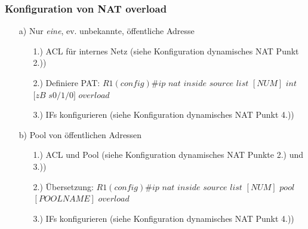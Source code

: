 \documentclass[landscape,twocolumn,a4paper]{article}
\begin{document}
\begin{footnotesize}
\subsubsection{Konfiguration von NAT overload}
\begin{itemize}
	\item[a)] Nur \textit{eine}, ev. unbekannte, öffentliche Adresse
	\begin{itemize}
		\item[1.)] ACL für internes Netz (siehe Konfiguration dynamisches NAT Punkt 2.))
		\item[2.)] Definiere PAT: $R1(config)\#ip$ $nat$ $inside$ $source$ $list$ $[NUM]$ $int$ $[zB$ $s0/1/0]$ $overload$
		\item[3.)] IFs konfigurieren (siehe Konfiguration dynamisches NAT Punkt 4.))
	\end{itemize}
	\item[b)] Pool von öffentlichen Adressen
	\begin{itemize}
		\item[1.)] ACL und Pool (siehe Konfiguration dynamisches NAT Punkte 2.) und 3.))
		\item[2.)] Übersetzung: $R1(config)\#ip$ $nat$ $inside$ $source$ $list$ $[NUM]$ $pool$ $[POOLNAME]$ $overload$
		\item[3.)] IFs konfigurieren (siehe Konfiguration dynamisches NAT Punkt 4.))
	\end{itemize}
\end{itemize}
\end{footnotesize}
\end{document}
